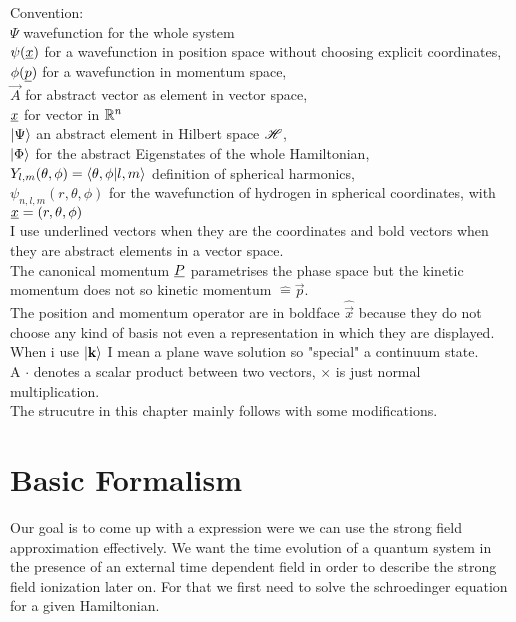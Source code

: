 Convention: \\
$\Psi$ wavefunction for the whole system  \\
$\psi(\underline{x})$ for a wavefunction in position space without choosing explicit coordinates, \\
$\phi(\underline{p})$  for a wavefunction in momentum space, \\
$\vec{A}$ for abstract vector as element in vector space, \\
$\underline{x}$ for vector in $\mathbb{R}^n$ \\
$\ket{\Psi}$ an abstract element in Hilbert space $\mathscr{H}$, \\
$\ket{\Phi}$ for the abstract Eigenstates of the whole Hamiltonian, \\
$Y_{l, m}(\theta, \phi) = \braket{\theta, \phi | l, m}$ definition of spherical harmonics, \\
$\psi_{n, l, m}(r, \theta, \phi)$ for the wavefunction of hydrogen in spherical coordinates, with $\underline{x}=(r, \theta, \phi)$ \\
I use underlined vectors when they are the coordinates and bold vectors when they are abstract elements in a vector space. \\
The canonical momentum $\underline{P}$ parametrises the phase space but the kinetic momentum does not so kinetic momentum $\hat{=} \vec{p}$.\\
The position and momentum operator are in boldface $\hat{\vec{x}}$ because they do not choose any kind of basis not even a representation in which they are displayed.\\
When i use $\ket{\mathbf{k}}$ I mean a plane wave solution so "special" a continuum state.\\
A $\cdot$ denotes a scalar product between two vectors, $\times$ is just normal multiplication. \\


The strucutre in this chapter mainly follows \cite{Ivanov20012005} with some modifications.



\newpage
\section{Basic Formalism}
Our goal is to come up with a expression were we can use the strong field approximation effectively.
We want the time evolution of a quantum system in the presence of an external time dependent field in order to describe the strong field ionization later on.
For that we first need to solve the schroedinger equation for a given Hamiltonian.


